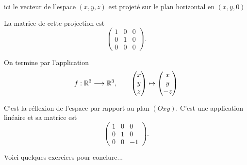 ici le vecteur de l’espace $(x,y,z)$ est projeté sur le plan horizontal en $(x,y,0)$ 

La matrice de cette projection est 
$$\begin{pmatrix}
1 & 0 & 0\\
0 & 1 & 0\\
0 & 0 & 0
\end{pmatrix}.$$

\diapo

On termine par l'application 
$$
f: \mathbb{R}^3  \longrightarrow \mathbb{R}^3, \qquad \begin{pmatrix}x\\y\\z\end{pmatrix} \mapsto \begin{pmatrix}x\\y\\-z\end{pmatrix}$$

C'est la réflexion de l'espace par rapport au plan $(Oxy)$. 
C'est une application linéaire et sa matrice est
\[ \begin{pmatrix}
1 & 0 & 0\\
0 & 1 & 0\\
0 & 0 & -1 
\end{pmatrix}
. \]

\diapo

Voici quelques exercices pour conclure...


